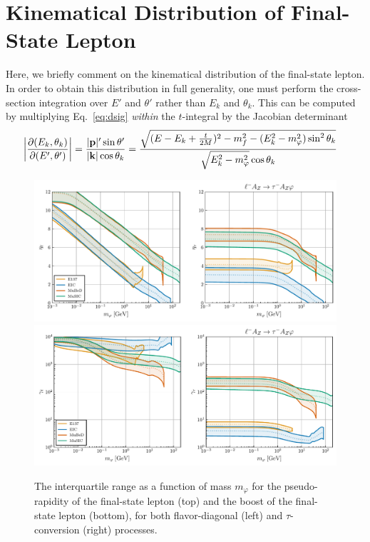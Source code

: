 \section{Kinematical Distribution of Final-State Lepton}\label{sec:l_kin}
Here, we briefly comment on the kinematical distribution of the final-state lepton. In order to obtain this distribution in full generality, one must perform the cross-section integration over $E'$ and $\theta'$ rather than $E_k$ and $\theta_k$. This can be computed by multiplying Eq.~\ref{eq:dsig} {\it within} the $t$-integral by the Jacobian determinant
\begin{align}
    \left|\frac{\partial(E_k,\theta_k)}{\partial(E', \theta')}\right| = \frac{|{\bf p}|'\sin{\theta'}}{|{\bf k}|\cos{\theta_k}} 
    &= \frac{\sqrt{(E - E_k + \frac{t}{2M})^2 - m_f^2 - (E_k^2 - m_\varphi^2)\sin^2{\theta_k}}}{\sqrt{E_k^2 - m_\varphi^2}\cos{\theta_k}}\label{eq:fs_lepton_jacobian}
\end{align}
\begin{figure}[t!]
    \centering
    \includegraphics[width=0.9\linewidth]{figures/chapter4/median_eta_lepton.pdf}
    \includegraphics[width=0.9\linewidth]{figures/chapter4/median_gamma_lepton.pdf}
    \caption[Interquartile range as a function of mass for pseudo-rapidity and boost distributions of leptons in certain scalar-production processes at lepton-nucleus collision experiments.]{The interquartile range as a function of mass $m_\varphi$ for the pseudo-rapidity of the final-state lepton (top) and the boost of the final-state lepton (bottom), for both flavor-diagonal (left) and $\tau$-conversion (right) processes.}
    \label{fig:eta_gamma_fs_lepton}
\end{figure}
